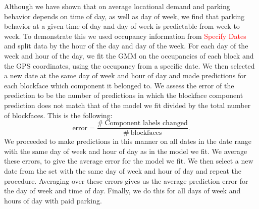\documentclass{article}
\begin{document}
Although we have shown that on average locational demand and parking behavior depends on time of day, as well as day of week, we find that parking behavior at a given time of day and day of week is predictable from week to week. To demonstrate this we used occupancy information from \textcolor{red}{Specify Dates} and split data by the hour of the day and day of the week. For each day of the week and hour of the day, we fit the GMM on the occupancies of each block and the GPS coordinates, using the occupancy from a specific date. We then selected a new date at the same day of week and hour of day and made predictions for each blockface which component it belonged to. We assess the error of the prediction to be the number of predictions in which the blockface component prediction does not match that of the model we fit divided by the total number of blockfaces. This is the following:
\begin{equation}
\text{error} = \frac{\# \ \text{Component labels changed}}{\# \ \text{blockfaces}}.
\end{equation}
We proceeded to make predictions in this manner on all dates in the date range with the same day of week and hour of day as in the model we fit. We average these errors, to give the average error for the model we fit. We then select a new date from the set with the same day of week and hour of day and repeat the procedure. Averaging over these errors gives us the average prediction error for the day of week and time of day. Finally, we do this for all days of week and hours of day with paid parking.
\begin{table}[H]
  \centering
  \caption{Average prediction error of the GMM over all paid days of the week and hours of the day.}
  \label{}
\end{table}
\end{document}
